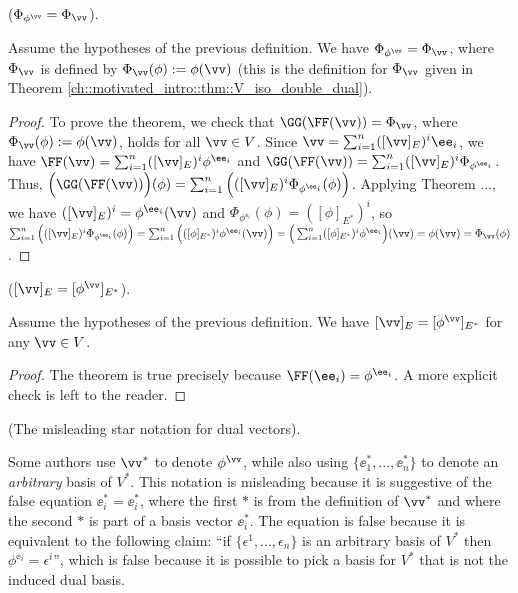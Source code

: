 \begin{theorem}
    \label{ch::motivated_intro::thm::Phiphiv_eq_Phiv}
    ($\Phi_{\phi^\vv} = \Phi_\vv$).

    Assume the hypotheses of the previous definition. We have $\Phi_{\phi^\vv} = \Phi_\vv$, where $\Phi_\vv$ is defined by $\Phi_\vv(\phi) := \phi(\vv)$ (this is the definition for $\Phi_\vv$ given in Theorem \ref{ch::motivated_intro::thm::V_iso_double_dual}).
\end{theorem}

\begin{proof}
    To prove the theorem, we check that $\GG(\FF(\vv)) = \Phi_\vv$, where $\Phi_\vv(\phi) := \phi(\vv)$, holds for all $\vv \in V$. Since $\vv = \sum_{i = 1}^n ([\vv]_E)^i \ee_i$, we have $\FF(\vv) = \sum_{i = 1}^n ([\vv]_E)^i \phi^{\ee_i}$ and $\GG(\FF(\vv)) = \sum_{i = 1}^n ([\vv]_E)^i \Phi_{\phi^{\ee_i}}$. Thus, $\Big(\GG(\FF(\vv))\Big)(\phi) = \sum_{i = 1}^n \Big( ([\vv]_E)^i \Phi_{\phi^{\ee_i}}(\phi) \Big)$. Applying Theorem ..., we have $([\vv]_E)^i = \phi^{\ee_i}(\vv)$ and $\Phi_{\phi^{\ee_i}}(\phi) = ([\phi]_{E^*})^i$, so $\sum_{i = 1}^n \Big( ([\vv]_E)^i \Phi_{\phi^{\ee_i}}(\phi) \Big) = \sum_{i = 1}^n \Big( ([\phi]_{E^*})^i \phi^{\ee_i}(\vv) \Big) = \Big(\sum_{i = 1}^n ([\phi]_{E^*})^i \phi^{\ee_i}\Big)(\vv) = \phi(\vv) = \Phi_\vv(\phi)$.
\end{proof}

\begin{theorem}
    \label{ch::bilinear_forms_metric_tensors::thm:vv_E_eq_phi_vv_Estar}
    
    ($[\vv]_E = [\phi^\vv]_{E^*}$).
    
    Assume the hypotheses of the previous definition. We have $[\vv]_E = [\phi^\vv]_{E^*}$ for any $\vv \in V$.
\end{theorem}

\begin{proof}
    The theorem is true precisely because $\FF(\ee_i) = \phi^{\ee_i}$. A more explicit check is left to the reader.
\end{proof}

\begin{remark}
    (The misleading star notation for dual vectors).
    
    Some authors use $\vv^*$ to denote $\phi^\vv$, while also using $\{\ee_1^*, ..., \ee_n^*\}$ to denote an \textit{arbitrary} basis of $V^*$. This notation is misleading because it is suggestive of the false equation $\ee_i^* = \ee_i^*$, where the first $*$ is from the definition of $\vv^*$ and where the second $*$ is part of a basis vector $\ee_i^*$. The equation is false because it is equivalent to the following claim: ``if $\{\epsilon^1, ..., \epsilon_n\}$ is an arbitrary basis of $V^*$ then $\phi^{\ee_i} = \epsilon^i$'', which is false because it is possible to pick a basis for $V^*$ that is not the induced dual basis.
\end{remark}


